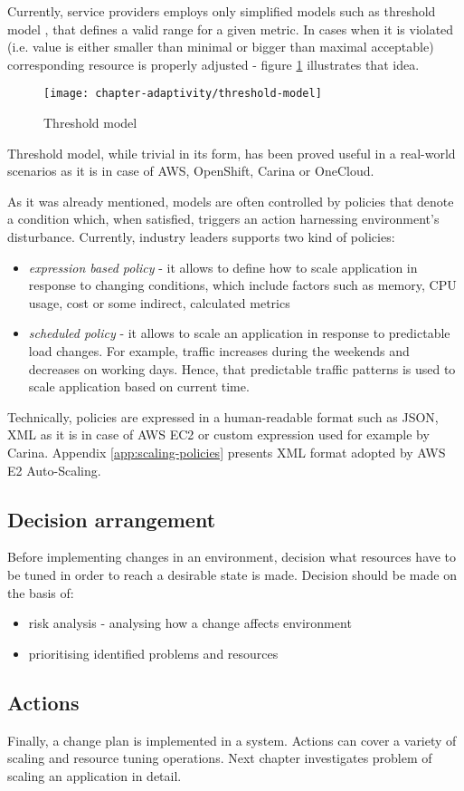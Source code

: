 Currently, service providers employs only simplified models such as threshold model \cite{LiWoZh05}, that defines a valid range for a given metric. In cases when it is violated (i.e. value is either smaller than minimal or bigger than maximal acceptable) corresponding resource is properly adjusted - figure \ref{fig:threshold-model} illustrates that idea.

\begin{figure}[!ht]
  \begin{center}
    \texttt{[image: chapter-adaptivity/threshold-model]}
  \end{center}
  \caption{Threshold model}
  \label{fig:threshold-model}
\end{figure}

Threshold model, while trivial in its form, has been proved useful in a real-world scenarios as it is in case of AWS, OpenShift, Carina or OneCloud.

As it was already mentioned, models are often controlled by policies that denote a condition which, when satisfied, triggers an action harnessing environment's disturbance. Currently, industry leaders supports \cite{AmazonAutoScaling} two kind of policies:
\begin{itemize}
 \item \textit{expression based policy} - it allows to define how to scale application in response to changing conditions, which include factors such as memory, CPU usage, cost or some indirect, calculated metrics
 \item \textit{scheduled policy} - it allows to scale an application in response to predictable load changes. For example, traffic increases during the weekends and decreases on working days. Hence, that predictable traffic patterns is used to scale application based on current time.
\end{itemize}

Technically, policies are expressed in a human-readable format such as JSON, XML as it is in case of AWS EC2 or custom expression used for example by Carina. Appendix \ref{app:scaling-policies} presents XML format adopted by AWS E2 Auto-Scaling.

\subsection{Decision arrangement}
Before implementing changes in an environment, decision what resources have to be tuned in order to reach a desirable state is made. Decision should be made on the basis of:
\begin{itemize}
 \item risk analysis - analysing how a change affects environment
 \item prioritising identified problems and resources
\end{itemize}

\subsection{Actions}
Finally, a change plan is implemented in a system. Actions can cover a variety of scaling and resource tuning operations. Next chapter investigates problem of scaling an application in detail.
